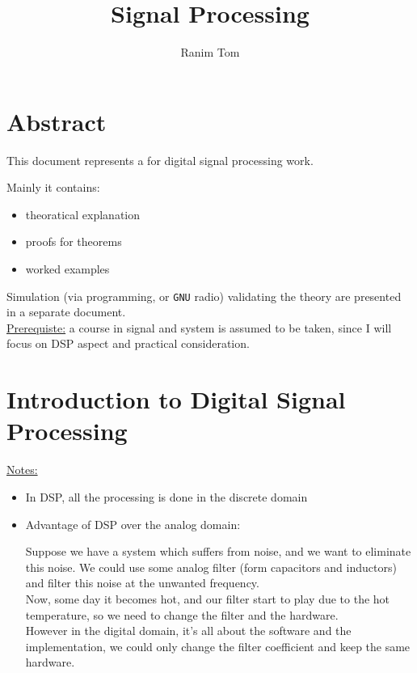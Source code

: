 \documentclass[12pt,a4paper]{book}
\title{Signal Processing}
\author{Ranim Tom}
\begin{document}
% 

\maketitle



\chapter*{Abstract}

This document represents a  for digital signal processing work. 

Mainly it contains:

\begin{itemize}

\item theoratical explanation

\item proofs for theorems

\item worked examples

\end{itemize}


Simulation (via programming, or \verb|GNU| radio) validating the theory are presented in a separate document.\\

\underline{Prerequiste:} a course in signal and system is assumed to be taken, since I will focus on DSP aspect and practical consideration.


\tableofcontents


\pagestyle{fancy}
\fancyhf{} %
\rhead{\rightmark}

\chapter{Introduction to Digital Signal Processing}

\underline{Notes:}\\

\begin{itemize}

\item In DSP, all the processing is done in the discrete domain

\item Advantage of DSP over the analog domain:

Suppose we have a system which suffers from noise, and we want to eliminate this noise. We could use some analog filter (form capacitors and inductors) and filter this noise at the unwanted frequency.\\

Now, some day it becomes hot, and our filter start to play due to the hot temperature, so we need to change the filter and the hardware.\\

However in the digital domain, it's all about the software and the implementation, we could only change the filter coefficient and keep the same hardware.

\end{itemize}
\end{document}
